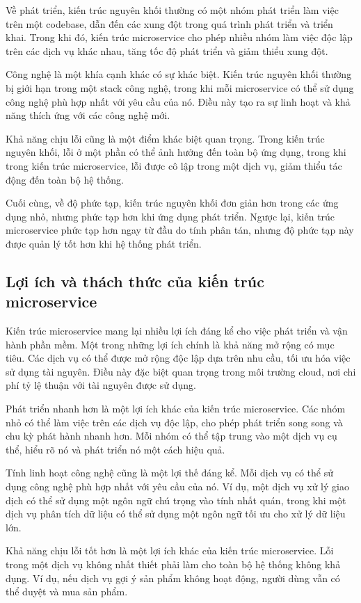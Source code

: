 Về phát triển, kiến trúc nguyên khối thường có một nhóm phát triển làm việc
trên một codebase, dẫn đến các xung đột trong quá trình phát triển và triển
khai. Trong khi đó, kiến trúc microservice cho phép nhiều nhóm làm việc độc lập
trên các dịch vụ khác nhau, tăng tốc độ phát triển và giảm thiểu xung đột.

Công nghệ là một khía cạnh khác có sự khác biệt. Kiến trúc nguyên khối thường
bị giới hạn trong một stack công nghệ, trong khi mỗi microservice có thể sử
dụng công nghệ phù hợp nhất với yêu cầu của nó. Điều này tạo ra sự linh hoạt và
khả năng thích ứng với các công nghệ mới.

Khả năng chịu lỗi cũng là một điểm khác biệt quan trọng. Trong kiến trúc nguyên
khối, lỗi ở một phần có thể ảnh hưởng đến toàn bộ ứng dụng, trong khi trong
kiến trúc microservice, lỗi được cô lập trong một dịch vụ, giảm thiểu tác động
đến toàn bộ hệ thống.

Cuối cùng, về độ phức tạp, kiến trúc nguyên khối đơn giản hơn trong các ứng
dụng nhỏ, nhưng phức tạp hơn khi ứng dụng phát triển. Ngược lại, kiến trúc
microservice phức tạp hơn ngay từ đầu do tính phân tán, nhưng độ phức tạp này
được quản lý tốt hơn khi hệ thống phát triển.

\subsection{Lợi ích và thách thức của kiến trúc microservice}
Kiến trúc microservice mang lại nhiều lợi ích đáng kể cho việc phát triển và
vận hành phần mềm. Một trong những lợi ích chính là khả năng mở rộng có mục
tiêu. Các dịch vụ có thể được mở rộng độc lập dựa trên nhu cầu, tối ưu hóa việc
sử dụng tài nguyên. Điều này đặc biệt quan trọng trong môi trường cloud, nơi
chi phí tỷ lệ thuận với tài nguyên được sử dụng.

Phát triển nhanh hơn là một lợi ích khác của kiến trúc microservice. Các nhóm
nhỏ có thể làm việc trên các dịch vụ độc lập, cho phép phát triển song song và
chu kỳ phát hành nhanh hơn. Mỗi nhóm có thể tập trung vào một dịch vụ cụ thể,
hiểu rõ nó và phát triển nó một cách hiệu quả.

Tính linh hoạt công nghệ cũng là một lợi thế đáng kể. Mỗi dịch vụ có thể sử
dụng công nghệ phù hợp nhất với yêu cầu của nó. Ví dụ, một dịch vụ xử lý giao
dịch có thể sử dụng một ngôn ngữ chú trọng vào tính nhất quán, trong khi một
dịch vụ phân tích dữ liệu có thể sử dụng một ngôn ngữ tối ưu cho xử lý dữ liệu
lớn.

Khả năng chịu lỗi tốt hơn là một lợi ích khác của kiến trúc microservice. Lỗi
trong một dịch vụ không nhất thiết phải làm cho toàn bộ hệ thống không khả
dụng. Ví dụ, nếu dịch vụ gợi ý sản phẩm không hoạt động, người dùng vẫn có thể
duyệt và mua sản phẩm.

